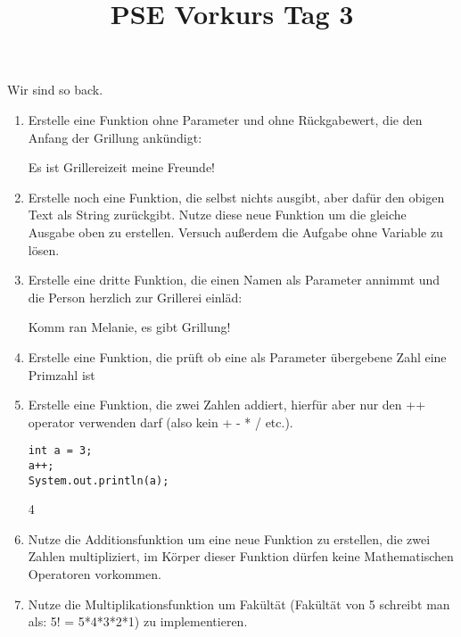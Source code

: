 \documentclass{../../sheet}
\title{PSE Vorkurs Tag 3}
\begin{document}
\maketitle
Wir sind so back.

\newpage


\begin{enumerate}
    \item Erstelle eine Funktion ohne Parameter und ohne Rückgabewert, die den Anfang der Grillung ankündigt:
    \begin{ausgabe}
Es ist Grillereizeit meine Freunde!
    \end{ausgabe}
    \item Erstelle noch eine Funktion, die selbst nichts ausgibt, aber dafür den obigen Text als String zurückgibt. Nutze diese neue Funktion um die gleiche Ausgabe oben zu erstellen. Versuch außerdem die Aufgabe ohne Variable zu lösen.
    \item Erstelle eine dritte Funktion, die einen Namen als Parameter annimmt und die Person herzlich zur Grillerei einläd:
    \begin{ausgabe}
Komm ran Melanie, es gibt Grillung!
    \end{ausgabe}
    \item Erstelle eine Funktion, die prüft ob eine als Parameter übergebene Zahl eine Primzahl ist
    \item Erstelle eine Funktion, die zwei Zahlen addiert, hierfür aber nur den ++ operator verwenden darf (also kein + - * / etc.). 
    \begin{verbatim}
int a = 3;
a++;
System.out.println(a);
    \end{verbatim}
    \begin{ausgabe}
        4
    \end{ausgabe}
    \item Nutze die Additionsfunktion um eine neue Funktion zu erstellen, die zwei Zahlen multipliziert, im Körper dieser Funktion dürfen keine Mathematischen Operatoren vorkommen.
    \item Nutze die Multiplikationsfunktion um Fakültät (Fakültät von 5 schreibt man als: 5! = 5*4*3*2*1) zu implementieren.
\end{enumerate}
\end{document}
